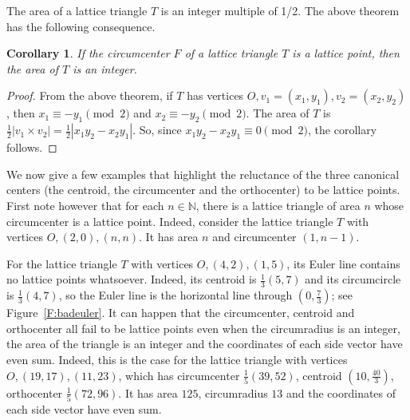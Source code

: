 \documentclass[10pt,preprint]{amsart}
\def\N{\mathbb N}
\theoremstyle{plain}
\newtheorem{corollary}{Corollary}
\theoremstyle{definition}
\theoremstyle{remark}
\begin{document}
The area of a lattice triangle $T$ is an integer multiple of 1/2. The above theorem has the following consequence.

\begin{corollary} 
If the circumcenter $F$ of a lattice triangle $T$ is a lattice point, then the area of $T$ is an integer. 
\end{corollary}

\begin{proof}
From the above theorem, if $T$ has vertices $O,v_1=(x_1,y_1),v_2=(x_2,y_2)$, then $x_1\equiv-y_1 \pmod 2 $ and  $x_2\equiv-y_2\pmod 2 $. The area of $T$ is 
$\frac12|v_1\times v_2|=\frac12|x_1 y_2-x_2 y_1|$. So, since $x_1 y_2-x_2 y_1\equiv 0\pmod 2 $, the corollary follows.
\end{proof}


We now give a few examples that highlight the reluctance of the three canonical centers (the centroid, the circumcenter and the orthocenter) to be lattice points. First note however that for each $n\in\N$, there is a lattice triangle of area $n$ whose circumcenter is a lattice point.
Indeed, consider the lattice triangle $T$ with vertices $O,(2,0),(n,n)$. It has area $n$ and circumcenter $(1,n-1)$.

For the lattice triangle $T$ with vertices $O,(4,2),(1,5)$,  its Euler line contains no lattice points whatsoever. Indeed, its  centroid is $\frac13(5,7)$ and its circumcircle is $\frac13(4,7)$, 
so the Euler line  is the horizontal line through $(0,\frac73)$; see Figure~\ref{F:badeuler}. 
It can happen that the circumcenter, centroid and orthocenter all fail to be lattice points even when the circumradius is an integer, the area of the triangle is an integer and the coordinates of each side vector  have even sum. Indeed,
this is the case for the lattice triangle with vertices $O,(19,17),(11,23)$, which has circumcenter $\frac15(39,52)$, centroid $(10,\frac{40}3)$, orthocenter $\frac15(72, 96)$. It has area $125$, circumradius $13$ and the coordinates of each side vector have even sum.
\end{document}
